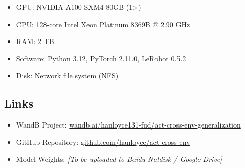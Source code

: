\documentclass[twoside,twocolumn,10pt]{article}
\begin{document}
\begin{itemize}[nosep]
  \item GPU: NVIDIA A100-SXM4-80GB (1$\times$)
  \item CPU: 128-core Intel Xeon Platinum 8369B @ 2.90 GHz
  \item RAM: 2 TB
  \item Software: Python 3.12, PyTorch 2.11.0, LeRobot 0.5.2
  \item Disk: Network file system (NFS)
\end{itemize}

\subsection*{Links}
\begin{itemize}[nosep]
  \item WandB Project:
        \href{https://wandb.ai/hanloyce131-fud/act-cross-env-generalization}
             {wandb.ai/hanloyce131-fud/act-cross-env-generalization}
  \item GitHub Repository: \href{https://github.com/hanloyce/act-cross-env}{github.com/hanloyce/act-cross-env}
  \item Model Weights: \emph{[To be uploaded to Baidu Netdisk / Google Drive]}
\end{itemize}
\end{document}
